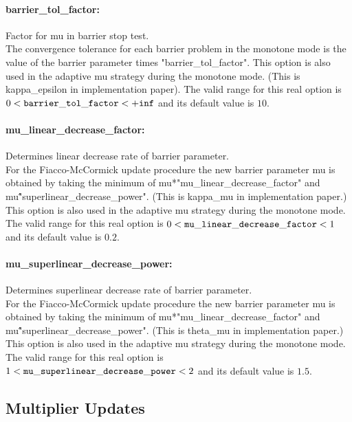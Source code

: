 \paragraph{barrier\_tol\_factor:}\label{sec:barrier_tol_factor} Factor for mu in barrier stop test. $\;$ \\
 The convergence tolerance for each barrier
problem in the monotone mode is the value of the
barrier parameter times "barrier\_tol\_factor".
This option is also used in the adaptive mu
strategy during the monotone mode. (This is
kappa\_epsilon in implementation paper). The valid range for this real option is 
$0 <  {\tt barrier\_tol\_factor } <  {\tt +inf}$
and its default value is $10$.


\paragraph{mu\_linear\_decrease\_factor:}\label{sec:mu_linear_decrease_factor} Determines linear decrease rate of barrier parameter. $\;$ \\
 For the Fiacco-McCormick update procedure the new
barrier parameter mu is obtained by taking the
minimum of mu*"mu\_linear\_decrease\_factor" and
mu\^"superlinear\_decrease\_power".  (This is
kappa\_mu in implementation paper.) This option
is also used in the adaptive mu strategy during
the monotone mode. The valid range for this real option is 
$0 <  {\tt mu\_linear\_decrease\_factor } <  1$
and its default value is $0.2$.


\paragraph{mu\_superlinear\_decrease\_power:}\label{sec:mu_superlinear_decrease_power} Determines superlinear decrease rate of barrier parameter. $\;$ \\
 For the Fiacco-McCormick update procedure the new
barrier parameter mu is obtained by taking the
minimum of mu*"mu\_linear\_decrease\_factor" and
mu\^"superlinear\_decrease\_power".  (This is
theta\_mu in implementation paper.) This option
is also used in the adaptive mu strategy during
the monotone mode. The valid range for this real option is 
$1 <  {\tt mu\_superlinear\_decrease\_power } <  2$
and its default value is $1.5$.


\subsection{Multiplier Updates}

